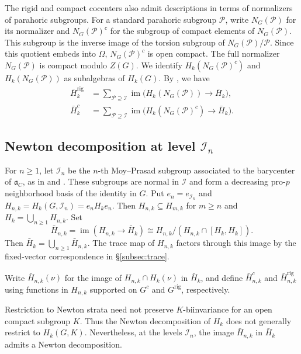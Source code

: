 \documentclass[11pt,letterpaper]{amsart}
\theoremstyle{definition}
\numberwithin{equation}{section}
\numberwithin{theorem}{section}
\let\ge\geqslant
\newcommand{\kk}{k}
\newcommand{\CI}{\mathcal I}
\newcommand{\rig}{\mathrm{rig}}
\DeclareMathOperator{\im}{im}
\begin{document}
The rigid and compact cocenters also admit descriptions in terms of normalizers of parahoric subgroups.
For a standard parahoric subgroup $\mathcal P$, write $N_G(\mathcal P)$ for its normalizer and $N_G(\mathcal P)^c$ for the subgroup of compact elements of $N_G(\mathcal P)$. This subgroup is the inverse image of the torsion subgroup of $N_G(\mathcal P)/\mathcal P$.
Since this quotient embeds into $\Omega$, $N_G(\mathcal P)^c$ is open compact. The full normalizer $N_G(\mathcal P)$ is compact modulo $Z(G)$. We identify $H_\kk(N_G(\mathcal P)^c)$ and $H_\kk(N_G(\mathcal P))$ as subalgebras of $H_\kk(G)$. By \cite[Proposition~21]{HeI}, we have
\[
 \begin{aligned}
 \bar H_\kk^{\rig}&=\sum_{\mathcal P\supseteq\CI}
       \im\bigl(
         H_\kk(N_G(\mathcal P))
         \to \bar H_\kk
       \bigr),\\
 \bar H_\kk^c
   &=\sum_{\mathcal P\supseteq\CI}
       \im\bigl(
         H_\kk(N_G(\mathcal P)^c)
         \to\bar H_\kk
       \bigr).
 \end{aligned}
\]

\subsection{Newton decomposition at level
\texorpdfstring{$\CI_n$}{I_n}}
\label{subsec:level-newton-decomposition}

For $n\ge1$, let $\CI_n$ be the $n$-th Moy--Prasad
subgroup associated to the barycenter of $\mathfrak a_C$,
as in \cite[\S4.2]{HeI} and \cite[\S1.2]{HeII}.
These subgroups are normal in $\CI$ and form a decreasing
pro-$p$ neighborhood basis of the identity in $G$.
Put $e_n=e_{\CI_n}$ and
$H_{n,\kk}=H_\kk(G,\CI_n)=e_nH_\kk e_n$.
Then $H_{n,\kk}\subseteq H_{m,\kk}$ for $m\ge n$ and
$H_\kk=\bigcup_{n\ge1}H_{n,\kk}$. Set
\[
 \bar H_{n,\kk}
   =\im(H_{n,\kk}\longrightarrow\bar H_\kk)
   \cong H_{n,\kk}/(H_{n,\kk}\cap[H_\kk,H_\kk]).
\]
Then $\bar H_\kk=\bigcup_{n\ge1}\bar H_{n,\kk}$.
The trace map of $H_{n,\kk}$ factors through this image
by the fixed-vector correspondence in
\S\ref{subsec:trace}.

Write $\bar H_{n,\kk}(\nu)$ for the image of
$H_{n,\kk}\cap H_\kk(\nu)$ in $\bar H_\kk$, and define
$\bar H_{n,\kk}^c$ and $\bar H_{n,\kk}^{\rig}$ using
functions in $H_{n,\kk}$ supported on $G^c$ and
$G^{\rig}$, respectively.

Restriction to Newton strata need not preserve
$K$-biinvariance for an open compact subgroup $K$.
Thus the Newton decomposition of $H_\kk$ does not generally restrict to $H_\kk(G,K)$.  Nevertheless, at the levels $\CI_n$, the image $\bar H_{n,\kk}$ in $\bar H_\kk$ admits a Newton decomposition.
\end{document}

